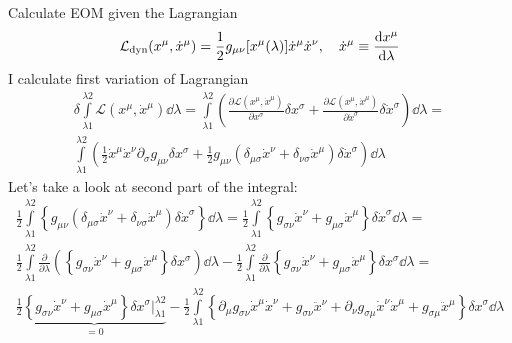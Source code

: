 \chapter{}

\problem 
Calculate EOM given the Lagrangian
%
\begin{equation}
    \mathcal{L}_{\text{dyn}}(x^\mu,\dot{x}^\mu) =
    \frac{1}{2}g_{\mu\nu}[x^\mu(\lambda)]\dot{x}^\mu\dot{x}^\nu, \quad
    \dot{x}^{\mu} \equiv \frac{\operatorname{d\!} x^\mu}{\dd\lambda}
\end{equation}
%
I calculate first variation of Lagrangian
%
\begin{multline}
    \delta\int\limits_{\lambda1}^{\lambda2}\mathcal{L}(x^\mu,\dot{x}^\mu)\dd\lambda =
    \int\limits_{\lambda1}^{\lambda2}
    \left(\frac{\partial\mathcal{L}(x^\mu,\dot{x}^\mu)}{\partial x^\sigma}\delta x^\sigma +
    \frac{\partial\mathcal{L}(x^\mu,\dot{x}^\mu)}{\partial \dot{x}^\sigma}\delta \dot{x}^\sigma\right)\dd\lambda = \\
    \int\limits_{\lambda1}^{\lambda2}
    \left(\frac{1}{2}\dot{x}^\mu\dot{x}^\nu \partial_\sigma g_{\mu\nu} \delta x^\sigma +
    \frac{1}{2}g_{\mu\nu}(\delta_{\mu\sigma} \dot{x}^\nu + \delta_{\nu\sigma} \dot{x}^\mu)\delta \dot{x}^\sigma\right)\dd\lambda
    \label{eq:ass3_prob1}
\end{multline}
%
Let's take a look at second part of the integral:
%
\begin{multline}
    \frac{1}{2}\int\limits_{\lambda1}^{\lambda2}
    \left\{g_{\mu\nu}(\delta_{\mu\sigma}
    \dot{x}^\nu + \delta_{\nu\sigma} \dot{x}^\mu)\delta \dot{x}^\sigma\right\}\dd\lambda =
    \frac{1}{2}\int\limits_{\lambda1}^{\lambda2}
    \left\{g_{\sigma\nu}\dot{x}^\nu + g_{\mu\sigma}\dot{x}^\mu \right\}
    \delta\dot{x}^\sigma\dd\lambda = \\
    \frac{1}{2}\int\limits_{\lambda1}^{\lambda2}
    \frac{\partial}{\partial\lambda}\left(\left\{
    g_{\sigma\nu}\dot{x}^\nu + g_{\mu\sigma}\dot{x}^\mu
    \right\}\delta x^\sigma\right)\dd\lambda -
    \frac{1}{2}\int\limits_{\lambda1}^{\lambda2}
    \frac{\partial}{\partial\lambda}\left\{
    g_{\sigma\nu}\dot{x}^\nu + g_{\mu\sigma}\dot{x}^\mu
    \right\}\delta x^\sigma\dd\lambda= \\
    \frac{1}{2}\underbrace{\left\{g_{\sigma\nu}\dot{x}^\nu + g_{\mu\sigma}\dot{x}^\mu\right\} \delta x^\sigma \Bigg|_{\lambda1}^{\lambda2}}_{=0} -
    \frac{1}{2}\int\limits_{\lambda1}^{\lambda2}
    \left\{
    \partial_{\mu}g_{\sigma\nu}\dot{x}^\mu\dot{x}^\nu + g_{\sigma\nu}\ddot{x}^\nu +
    \partial_{\nu}g_{\sigma\mu}\dot{x}^\nu\dot{x}^\mu + g_{\sigma\mu}\ddot{x}^\mu
    \right\}\delta x^\sigma\dd\lambda \\
\end{multline}
